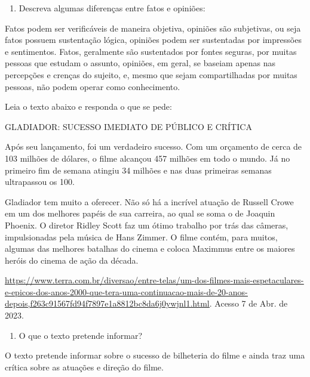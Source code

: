 \begin{enumerate}
\def\labelenumi{\arabic{enumi})}
\setcounter{enumi}{1}
\tightlist
\item
  Descreva algumas diferenças entre fatos e opiniões:
\end{enumerate}

Fatos podem ser verificáveis de maneira objetiva, opiniões são
subjetivas, ou seja fatos possuem sustentação lógica, opiniões podem ser
sustentadas por impressões e sentimentos. Fatos, geralmente são
sustentados por fontes seguras, por muitas pessoas que estudam o
assunto, opiniões, em geral, se baseiam apenas nas percepções e crenças
do sujeito, e, mesmo que sejam compartilhadas por muitas pessoas, não
podem operar como conhecimento.

Leia o texto abaixo e responda o que se pede:

GLADIADOR: SUCESSO IMEDIATO DE PÚBLICO E CRÍTICA

Após seu lançamento, foi um verdadeiro sucesso. Com um orçamento de
cerca de 103 milhões de dólares, o filme alcançou 457 milhões em todo o
mundo. Já no primeiro fim de semana atingiu 34 milhões e nas duas
primeiras semanas ultrapassou os 100.

Gladiador tem muito a oferecer. Não só há a incrível atuação de Russell
Crowe em um dos melhores papéis de sua carreira, ao qual se soma o de
Joaquin Phoenix. O diretor Ridley Scott faz um ótimo trabalho por trás
das câmeras, impulsionadas pela música de Hans Zimmer. O filme contém,
para muitos, algumas das melhores batalhas do cinema e coloca Maximmus
entre os maiores heróis do cinema de ação da década.

\href{https://www.terra.com.br/diversao/entre-telas/um-dos-filmes-mais-espetaculares-e-epicos-dos-anos-2000-que-tera-uma-continuacao-mais-de-20-anos-depois,f263c91567fd94f7897e1a8812bc8da6j0ywjnl1.html}{\uline{https://www.terra.com.br/diversao/entre-telas/um-dos-filmes-mais-espetaculares-e-epicos-dos-anos-2000-que-tera-uma-continuacao-mais-de-20-anos-depois,f263c91567fd94f7897e1a8812bc8da6j0ywjnl1.html}}.
Acesso 7 de Abr. de 2023.

\begin{enumerate}
\def\labelenumi{\arabic{enumi})}
\setcounter{enumi}{2}
\tightlist
\item
  O que o texto pretende informar?
\end{enumerate}

O texto pretende informar sobre o sucesso de bilheteria do filme e ainda
traz uma crítica sobre as atuações e direção do filme.

